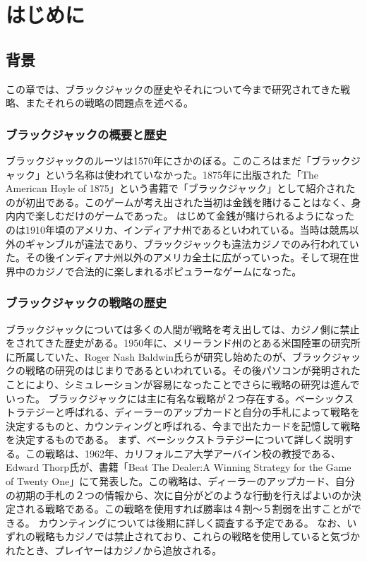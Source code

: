 \chapter{はじめに}
\section{背景}
この章では、ブラックジャックの歴史やそれについて今まで研究されてきた戦略、またそれらの戦略の問題点を述べる。

\subsection{ブラックジャックの概要と歴史}
ブラックジャックのルーツは1570年にさかのぼる。このころはまだ「ブラックジャック」という名称は使われていなかった。1875年に出版された「The American Hoyle of 1875」という書籍で「ブラックジャック」として紹介されたのが初出である。このゲームが考え出された当初は金銭を賭けることはなく、身内内で楽しむだけのゲームであった。
はじめて金銭が賭けられるようになったのは1910年頃のアメリカ、インディアナ州であるといわれている。当時は競馬以外のギャンブルが違法であり、ブラックジャックも違法カジノでのみ行われていた。その後インディアナ州以外のアメリカ全土に広がっていった。そして現在世界中のカジノで合法的に楽しまれるポピュラーなゲームになった。

\subsection{ブラックジャックの戦略の歴史}
ブラックジャックについては多くの人間が戦略を考え出しては、カジノ側に禁止をされてきた歴史がある。1950年に、メリーランド州のとある米国陸軍の研究所に所属していた、Roger Nash Baldwin氏らが研究し始めたのが、ブラックジャックの戦略の研究のはじまりであるといわれている。その後パソコンが発明されたことにより、シミュレーションが容易になったことでさらに戦略の研究は進んでいった。
ブラックジャックには主に有名な戦略が２つ存在する。ベーシックストラテジーと呼ばれる、ディーラーのアップカードと自分の手札によって戦略を決定するものと、カウンティングと呼ばれる、今まで出たカードを記憶して戦略を決定するものである。
まず、ベーシックストラテジーについて詳しく説明する。この戦略は、1962年、カリフォルニア大学アーバイン校の教授である、Edward Thorp氏が、書籍「Beat The Dealer:A Winning Strategy for the Game of Twenty One」にて発表した。この戦略は、ディーラーのアップカード、自分の初期の手札の２つの情報から、次に自分がどのような行動を行えばよいのか決定される戦略である。この戦略を使用すれば勝率は４割～５割弱を出すことができる。
カウンティングについては後期に詳しく調査する予定である。
なお、いずれの戦略もカジノでは禁止されており、これらの戦略を使用していると気づかれたとき、プレイヤーはカジノから追放される。

